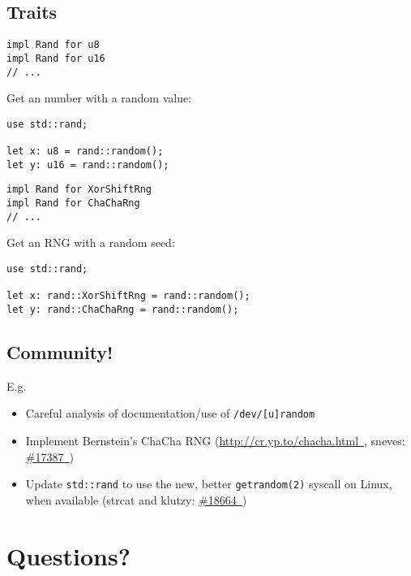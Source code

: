 \documentclass[14pt]{beamer}
\newcommand{\exturl}[1]{\exthref{#1}{#1}}
\newcommand{\exthref}[2]{\href{#1}{#2\ \footnotesize\faExternalLink}}
\begin{document}
\subsection{Traits}
\begin{frame}[fragile]
  \begin{verbatim}
impl Rand for u8
impl Rand for u16
// ...
  \end{verbatim}

Get an number with a random value:

  \begin{verbatim}
use std::rand;

let x: u8 = rand::random();
let y: u16 = rand::random();
  \end{verbatim}
\end{frame}
\begin{frame}[fragile]
  \begin{verbatim}
impl Rand for XorShiftRng
impl Rand for ChaChaRng
// ...
  \end{verbatim}

Get an RNG with a random seed:

  \begin{verbatim}
use std::rand;

let x: rand::XorShiftRng = rand::random();
let y: rand::ChaChaRng = rand::random();
  \end{verbatim}
\end{frame}

\subsection{Community!}

\begin{frame}
  E.g.

  \begin{itemize}
  \item Careful analysis of documentation/use of
    \texttt{/dev/[u]random}
    \item Implement Bernstein's ChaCha RNG
      (\exturl{http://cr.yp.to/chacha.html}, sneves: \exthref{https://github.com/rust-lang/rust/pull/17387}{\#17387})
  \item Update \texttt{std::rand} to use the new, better
    \texttt{getrandom(2)} syscall on Linux, when available
    (strcat and klutzy: \exthref{https://github.com/rust-lang/rust/pull/18664}{\#18664})
  \end{itemize}
\end{frame}

\section{Questions?}
\end{document}
